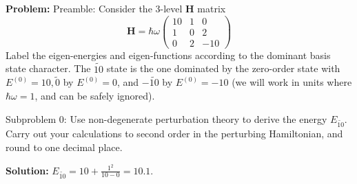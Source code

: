 \documentclass[10pt]{article}
\begin{document}
\textbf{Problem:}
Preamble: Consider the 3-level $\mathbf{H}$ matrix
\[
\mathbf{H}=\hbar \omega\left(\begin{array}{ccc}
10 & 1 & 0 \\
1 & 0 & 2 \\
0 & 2 & -10
\end{array}\right)
\]
Label the eigen-energies and eigen-functions according to the dominant basis state character. The $\widetilde{10}$ state is the one dominated by the zero-order state with $E^{(0)}=10, \tilde{0}$ by $E^{(0)}=0$, and $-\widetilde{10}$ by $E^{(0)}=-10$ (we will work in units where $\hbar \omega = 1$, and can be safely ignored).

Subproblem 0: Use non-degenerate perturbation theory to derive the energy $E_{\widetilde{10}}$.  Carry out your calculations to second order in the perturbing Hamiltonian, and round to one decimal place.


\textbf{Solution:}
$E_{\widetilde{10}} = 10 + \frac{1^2}{10 - 0} = \boxed{10.1}.$
\end{document}
